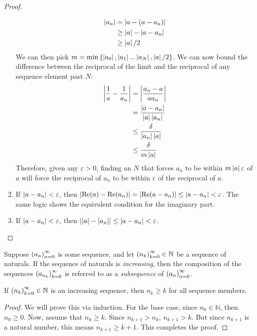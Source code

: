 \begin{proof}
\begin{enumerate}
\begin{align*}
\left\lvert a_n \right\rvert &= \left\lvert a-(a-a_n) \right\rvert\\
&\geq \left\lvert a \right\rvert - \left\lvert a-a_n \right\rvert\\
&\geq \left\lvert a \right\rvert/2
\end{align*}
We can then pick $m = \operatorname{min}{\left\{\left\lvert a_0 \right\rvert, \left\lvert a_1 \right\rvert... \left\lvert a_N \right\rvert, \left\lvert a \right\rvert/2\right\}}$. We can now bound the difference between the reciprocal of the limit and the reciprocal of any sequence element past $N$:
\begin{align*}
\left\lvert \frac{1}{a}-\frac{1}{a_n} \right\rvert &= \left\lvert \frac{a_n-a}{aa_n} \right\rvert\\
&= \frac{\left\lvert a-a_n \right\rvert}{\left\lvert a \right\rvert{\left\lvert a_n \right\rvert}}\\
&\leq \frac{\delta}{\left\lvert a_n \right\rvert\left\lvert a \right\rvert}\\
&\leq \frac{\delta}{m\left\lvert a \right\rvert}
\end{align*}
Therefore, given any $\varepsilon > 0$, finding an $N$ that forces $a_n$ to be within $m\left\lvert a \right\rvert\varepsilon$ of $a$ will force the reciprocal of $a_n$ to be within $\varepsilon$ of the reciprocal of $a$.
\item If $\left\lvert a-a_n \right\rvert < \varepsilon$, then $\left\lvert \operatorname{Re}({a})-\operatorname{Re}({a_n}) \right\rvert = \left\lvert \operatorname{Re}({a-a_n}) \right\rvert \leq \left\lvert a-a_n \right\rvert < \varepsilon$. The same logic shows the equivalent condition for the imaginary part.
\item If $\left\lvert a-a_n \right\rvert < \varepsilon$, then $\left\lvert \left\lvert a \right\rvert-\left\lvert a_n \right\rvert \right\rvert \leq \left\lvert a-a_n \right\rvert < \varepsilon$.
\end{enumerate}
\end{proof}
\begin{definition}[Subsequence]
Suppose $\seq{a}$ is some sequence, and let $\seq{n}[k]\in \mathbb{N}$ be a sequence of naturals. If the sequence of naturals is \emph{increasing}, then the composition of the sequences $\seq{a}[n_k][k]$ is referred to as a \emph{subsequence} of $\seq{a}$.
\end{definition}
\begin{lemma}
If $\seq{n}[k] \in \mathbb{N}$ is an increasing sequence, then $n_k \geq k$ for all sequence members.
\end{lemma}
\begin{proof}
We will prove this via induction. For the base case, since $n_0 \in \mathbb{N}$, then $n_0 \geq 0$. Now, assume that $n_k \geq k$. Since $n_{k+1} > n_k$, $n_{k+1} > k$. But since $n_{k+1}$ is a natural number, this means $n_{k+1} \geq k+1$. This completes the proof.
\end{proof}
